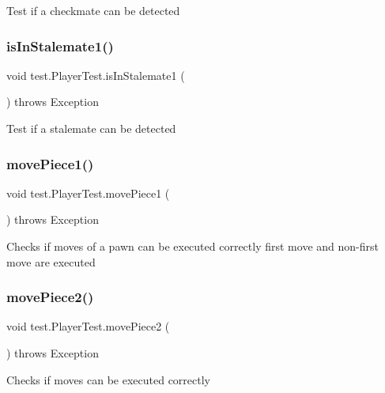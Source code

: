 Test if a checkmate can be detected \mbox{\label{classtest_1_1_player_test_a0b1c927561968c583b282814f7940655}} 
\subsubsection{\texorpdfstring{is\+In\+Stalemate1()}{isInStalemate1()}}
{\footnotesize\ttfamily void test.\+Player\+Test.\+is\+In\+Stalemate1 (\begin{DoxyParamCaption}{ }\end{DoxyParamCaption}) throws Exception}

Test if a stalemate can be detected \mbox{\label{classtest_1_1_player_test_acc727d15c4b9047f5b91d30929b88cac}} 
\subsubsection{\texorpdfstring{move\+Piece1()}{movePiece1()}}
{\footnotesize\ttfamily void test.\+Player\+Test.\+move\+Piece1 (\begin{DoxyParamCaption}{ }\end{DoxyParamCaption}) throws Exception}

Checks if moves of a pawn can be executed correctly first move and non-\/first move are executed \mbox{\label{classtest_1_1_player_test_a98a741ccef6e205a375db45f1292795a}} 
\subsubsection{\texorpdfstring{move\+Piece2()}{movePiece2()}}
{\footnotesize\ttfamily void test.\+Player\+Test.\+move\+Piece2 (\begin{DoxyParamCaption}{ }\end{DoxyParamCaption}) throws Exception}

Checks if moves can be executed correctly \mbox{\label{classtest_1_1_player_test_aab36d53fa06c66d4f9d8c091faebabc7}} 

